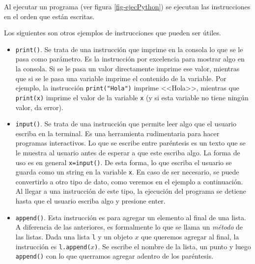 \documentclass[a4paper, 12pt]{report}
\theoremstyle{definition}
\begin{document}
Al ejecutar un programa (ver figura \ref{fig-ejecPython}) se ejecutan las instrucciones en el orden que están escritas.

Los siguientes son otros ejemplos de instrucciones que pueden ser útiles.
\begin{itemize}
	\item {\tt print()}. Se trata de una instrucción que imprime en la consola lo que se le pasa como parámetro. Es la instrucción por excelencia para mostrar algo en la consola. Si se le pasa un valor directamente imprime ese valor, mientras que si se le pasa una variable imprime el contenido de la variable. Por ejemplo, la instrucción {\tt print("Hola")} imprime <<Hola>>, mientras que {\tt print(x)} imprime el valor de la variable {\tt x} (y si esta variable no tiene ningún valor, da error).
	
	\item {\tt input()}. Se trata de una instrucción que permite leer algo que el usuario escriba en la terminal. Es una herramienta rudimentaria para hacer programas interactivos. Lo que se escribe entre paréntesis es un texto que se le muestra al usuario antes de esperar a que este escriba algo. La forma de uso es en general  {\tt x=input()}. De esta forma, lo que escriba el usuario se guarda como un string en la variable {\tt x}. En caso de ser necesario, se puede convertirlo a otro tipo de dato, como veremos en el ejemplo a continuación. Al llegar a una instrucción de este tipo, la ejecución del programa se detiene hasta que el usuario escriba algo y presione enter.
	
	\item {\tt append()}. Esta instrucción es para agregar un elemento al final de una lista. A diferencia de las anteriores, es formalmente lo que se llama un {\sl método} de las listas. Dada una lista {\tt l} y un objeto $x$ que queremos agregar al final, la instrucción es {\tt l.append($x$)}. Se escribe el nombre de la lista, un punto y luego {\tt append()} con lo que querramos agregar adentro de los paréntesis. 
\end{itemize}
\end{document}
